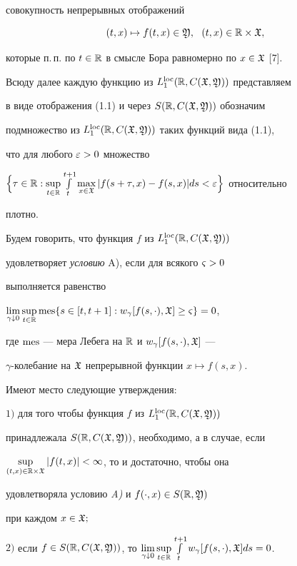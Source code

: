 совокупность непрерывных отображений


\begin{equation}


(t,x)\mapsto f(t,x)\in\gY,\ \ (t,x)\in\R\times\gX,


\end{equation}


которые п.\,п. по $t\in\Bbb R$ в смысле Бора равномерно по $x\in\frak X$ [7].


Всюду далее каждую функцию из $L_{1}^{\operatorname{loc}}(\Bbb R,C(\frak X,\frak Y))$ представляем


в виде отображения (1.1) и через $S(\Bbb R,C(\frak X,\frak Y))$ обозначим


подмножество из $L_{1}^{\operatorname{loc}}(\Bbb R,C(\frak X,\frak Y))$ таких функций вида (1.1),


что для любого $\varepsilon>0$ множество


$\Big\{\tau\in\R:\sup\lt_{t\in\R}\int\lt_{t}^{t+1}


\max\lt_{x\in\gX}|f(s+\tau,x)-f(s,x)|ds<\ve\Big\}$ относительно


плотно.





Будем говорить, что функция $f$ из $L_{1}^{\operatorname{loc}}(\Bbb R,C(\frak X,\frak Y))$


удовлетворяет {\it условию} A), если для всякого $\varsigma>0$


выполняется равенство


$\lim\lt_{\gamma\downarrow 0}\sup\lt_{t\in\R}\mes\{s\in


[t,t+1]:w_{\gamma}[f(s,\cdot),\gX]\ge\vsg\}=0$,


где $\operatorname{mes}$ --- мера Лебега на $\Bbb R$ и $w_{\gamma}[f(s,\cdot),\frak X]$ ---


$\gamma$-колебание на $\frak X$ непрерывной функции $x\mapsto f(s,x)$.





\begin{lems}


Имеют место следующие утверждения${:}$





$1)$ для того чтобы функция $f$ из $L_{1}^{\operatorname{loc}}(\Bbb R,C(\frak X,\frak Y))$


принадлежала $S(\Bbb R,C(\frak X,\frak Y))$, необходимо, а в случае, если


$\sup\limits_{(t,x)\in\Bbb R\times\frak X}|f(t,x)|<\infty$, то и достаточно, чтобы она


удовлетворяла условию {\em A)} и $f(\cdot,x)\in S(\Bbb R,\frak Y)$


при каждом $x\in\frak X;$





$2)$ если $f\in S(\R,C(\gX,\gY))$, то $\lim\lt_{\gamma\downarrow 0}


\sup\lt_{t\in\R}\int\lt_{t}^{t+1}w_{\gamma}[f(s,\cdot),\gX]ds=0$.


\end{lems}






